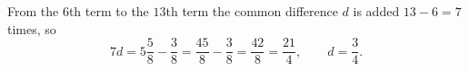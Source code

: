 From the $6$th term to the $13$th term the common difference $d$ is added $13-6=7$ times, so
\[7d=5\dfrac{5}{8}-\dfrac{3}{8}=\dfrac{45}{8}-\dfrac{3}{8}=\dfrac{42}{8}=\dfrac{21}{4},\qquad d=\boxed{\dfrac{3}{4}}.\]
